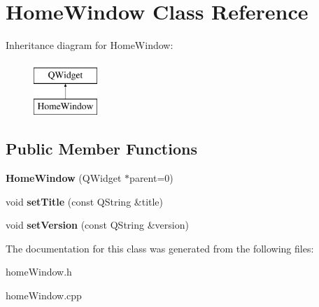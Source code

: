 \hypertarget{class_home_window}{}\section{Home\+Window Class Reference}
\label{class_home_window}
Inheritance diagram for Home\+Window\+:\begin{figure}[H]
\begin{center}
\leavevmode
\includegraphics[height=2.000000cm]{class_home_window}
\end{center}
\end{figure}
\subsection*{Public Member Functions}
\begin{DoxyCompactItemize}
\item 
\mbox{\label{class_home_window_a33f9ed05f73e54e47cdbf7a326efe1de}} 
{\bfseries Home\+Window} (Q\+Widget $\ast$parent=0)
\item 
\mbox{\label{class_home_window_ab795c5c12c6a6056d65346e329bedaa3}} 
void {\bfseries set\+Title} (const Q\+String \&title)
\item 
\mbox{\label{class_home_window_a0e3f13c0ded7687753424daa3021e0ee}} 
void {\bfseries set\+Version} (const Q\+String \&version)
\end{DoxyCompactItemize}


The documentation for this class was generated from the following files\+:\begin{DoxyCompactItemize}
\item 
home\+Window.\+h\item 
home\+Window.\+cpp\end{DoxyCompactItemize}
